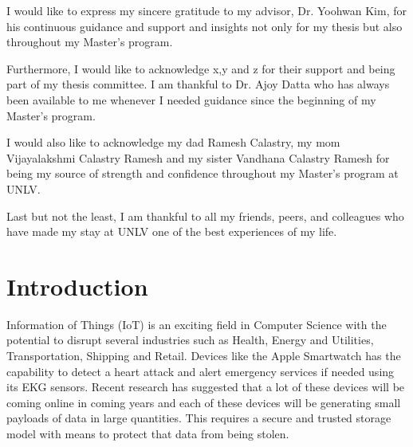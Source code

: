 \documentclass[11pt,openright]{report}
\begin{document}
\begin{thesisacknowledgments}
I would like to express my sincere gratitude to my advisor, Dr. Yoohwan Kim, for his continuous guidance and support and insights not only for my thesis but also throughout my Master's program.

Furthermore, I would like to acknowledge x,y and z for their support and being part of my thesis committee. I am thankful to Dr. Ajoy Datta who has always been available to me whenever I needed guidance since the beginning of my Master's program.

I would also like to acknowledge my dad Ramesh Calastry, my mom Vijayalakshmi Calastry Ramesh and my sister Vandhana Calastry Ramesh for being my source of strength and confidence throughout my Master's program at UNLV.

Last but not the least, I am thankful to all my friends, peers, and colleagues who have made my stay at UNLV one of the best experiences of my life. 
\end{thesisacknowledgments}

\pagestyle{plain}

\tableofcontents
\clearpage
\listoftables
\clearpage
\listoffigures
\clearpage
\listofalgorithms
\clearpage

\chapter{Introduction}\label{chapter:introduction} 

Information of Things (IoT) is an exciting field in Computer Science with the potential to disrupt several industries such as Health, Energy and Utilities, Transportation, Shipping and Retail. Devices like the Apple Smartwatch has the capability to detect a heart attack and alert emergency services if needed using its EKG sensors. Recent research has suggested that a lot of these devices will be coming online in coming years and each of these devices will be generating small payloads of data in large quantities. This requires a secure and trusted storage model with means to protect that data from being stolen. 
\end{document}

